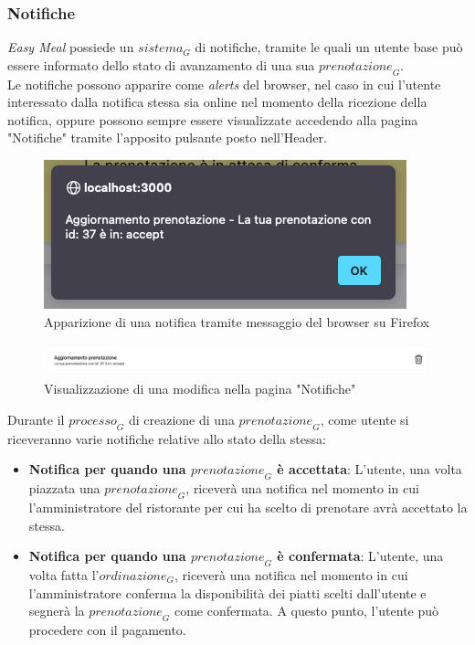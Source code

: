 \subsubsection{Notifiche}
\textit{Easy Meal} possiede un $\textit{sistema}_G$ di notifiche, tramite le quali un utente base può essere informato dello stato di avanzamento di una sua $\textit{prenotazione}_G$. \\
Le notifiche possono apparire come \textit{alerts} del browser, nel caso in cui l'utente interessato dalla notifica stessa sia online nel momento della ricezione della notifica, oppure possono sempre essere visualizzate accedendo alla pagina "Notifiche" tramite l'apposito pulsante posto nell'Header. 
\begin{figure}[H]
    \centering
    \includegraphics[width=0.4\linewidth]{img/notica_browser.png}
    \caption{Apparizione di una notifica tramite messaggio del browser su Firefox}
\end{figure}
\begin{figure}[H]
    \centering
    \includegraphics[width=0.8\linewidth]{img/notifica_pagina.png}
    \caption{Visualizzazione di una modifica nella pagina "Notifiche"}
\end{figure}
Durante il $\textit{processo}_G$ di creazione di una $\textit{prenotazione}_G$, come utente si riceveranno varie notifiche relative allo stato della stessa: 
\begin{itemize}
    \item \textbf{Notifica per quando una $\textit{prenotazione}_G$ è accettata}: L'utente, una volta piazzata una $\textit{prenotazione}_G$, riceverà una notifica nel momento in cui l'amministratore del ristorante per cui ha scelto di prenotare avrà accettato la stessa. 
    \item \textbf{Notifica per quando una $\textit{prenotazione}_G$ è confermata}: L'utente, una volta fatta l'$\textit{ordinazione}_G$, riceverà una notifica nel momento in cui l'amministratore conferma la disponibilità dei piatti scelti dall'utente e segnerà la $\textit{prenotazione}_G$ come confermata. A questo punto, l'utente può procedere con il pagamento. 
\end{itemize}


